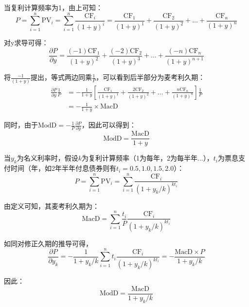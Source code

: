 \documentclass[11pt]{article}
\begin{document}
当复利计算频率为1，由上可知：
\begin{equation*}
    P = \sum_{i=1}^{n} \text{PV}_i = \sum_{i=1}^{n} \frac{\text{CF}_i}{(1+y)^i}
    = \frac{\text{CF}_1}{(1+y)^1} + \frac{\text{CF}_2}{(1+y)^2} + \dots + \frac{\text{CF}_n}{(1+y)^{n}}
\end{equation*}

对y求导可得：
\begin{equation*}
    \frac{\partial P}{\partial y} = \frac{(-1)\text{CF}_1}{(1+y)^2} + \frac{(-2)\text{CF}_2}{(1+y)^3} + \dots + \frac{(-n)\text{CF}_n}{(1+y)^{n+1}}
\end{equation*}

将$\frac{-1}{(1+y)}$提出，等式两边同乘$\frac{1}{P}$，可以看到后半部分为麦考利久期：
\begin{align*}
    \frac{\partial P}{\partial y} \frac{1}{P} &= -\frac{1}{1+y} \left[ \frac{\text{CF}_1}{(1+y)^1} + \frac{2\text{CF}_2}{(1+y)^2} + \dots + \frac{n \text{CF}_n}{(1+y)^{n}} \right] \frac{1}{P} \\
    &= -\frac{1}{1+y} \times \text{MacD}
\end{align*}

同时，由于$\text{ModD} = -\frac{1}{P} \frac{\partial P}{\partial y}$，因此可以得到：
\begin{equation*}
    \text{ModD} = \frac{\text{MacD}}{1+y}
\end{equation*}

当$y_k$为名义利率时，假设$k$为复利计算频率（1为每年，2为每半年...），$t_i$为票息支付时间（年，如2年半年付息债券则有$t_i=0.5,1.0,1.5,2.0$）：
\begin{equation*}
    P = \sum_{i=1}^{n} \text{PV}_i = \sum_{i=1}^{n} \frac{\text{CF}_i}{(1+y_k/k)^{k t_i}}
\end{equation*}

由定义可知，其麦考利久期为：
\begin{equation*}
    \text{MacD} = \sum_{i=1}^{n} \frac{t_i}{P} \frac{\text{CF}_i}{(1+y_k/k)^{k t_i}}
\end{equation*}

如同对修正久期的推导可得，
\begin{equation*}
    \frac{\partial P}{\partial y_k} = - \frac{1}{1+y_k/k} \sum_{i=1}^{n} t_i \frac{\text{CF}_i}{(1+y_k/k)^{k t_i}} = - \frac{\text{MacD} \times P}{1 + y_k/k}
\end{equation*}

因此：
\begin{equation*}
    \text{ModD} = \frac{\text{MacD}}{1+y_k/k}
\end{equation*}
\end{document}
